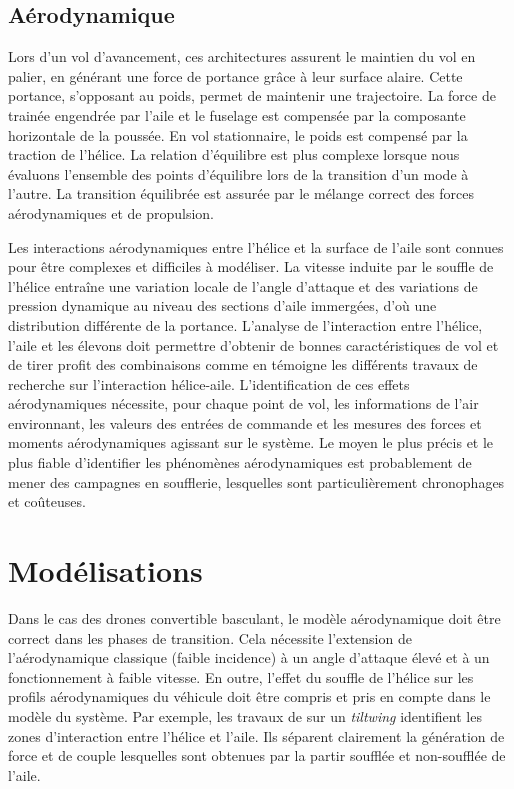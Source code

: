     \subsection{Aérodynamique}

    Lors d'un vol d'avancement, ces architectures assurent le maintien du vol en palier, en générant une force de portance grâce à leur surface alaire. Cette portance, s'opposant au poids, permet de maintenir une trajectoire. La force de trainée engendrée par l'aile et le fuselage est compensée par la composante horizontale de la poussée. En vol stationnaire, le poids est compensé par la traction de l'hélice. La relation d'équilibre est plus complexe lorsque nous évaluons l'ensemble des points d'équilibre lors de la transition d'un mode à l'autre. La transition équilibrée est assurée par le mélange correct des forces aérodynamiques et de propulsion.

    Les interactions aérodynamiques entre l'hélice et la surface de l'aile sont connues pour être complexes et difficiles à modéliser. La vitesse induite par le souffle de l'hélice entraîne une variation locale de l'angle d'attaque et des variations de pression dynamique au niveau des sections d'aile immergées, d'où une distribution différente de la portance. L'analyse de l'interaction entre l'hélice, l'aile et les élevons doit permettre d'obtenir de bonnes caractéristiques de vol et de tirer profit des combinaisons comme en témoigne les différents travaux  de recherche sur l'interaction hélice-aile. 
     L'identification de ces effets aérodynamiques nécessite, pour chaque point de vol, les informations de l'air environnant, les valeurs des entrées de commande et les mesures des forces et moments aérodynamiques agissant sur le système. Le moyen le plus précis et le plus fiable d'identifier les phénomènes aérodynamiques est probablement de mener des campagnes en soufflerie, lesquelles sont particulièrement chronophages et coûteuses.


\section{Modélisations}
Dans le cas des drones convertible basculant, le modèle aérodynamique doit être correct dans les phases de transition. Cela nécessite l'extension de l'aérodynamique classique (faible incidence) à un angle d'attaque élevé et à un fonctionnement à faible vitesse. En outre, l'effet du souffle de l'hélice sur les profils aérodynamiques du véhicule doit être compris et pris en compte dans le modèle du système. Par exemple, les travaux de \cite{9444145} sur un \textit{tiltwing} identifient les zones d'interaction entre l'hélice et l'aile. Ils séparent clairement la génération de force et de couple lesquelles sont obtenues par la partir soufflée et non-soufflée de l'aile.


